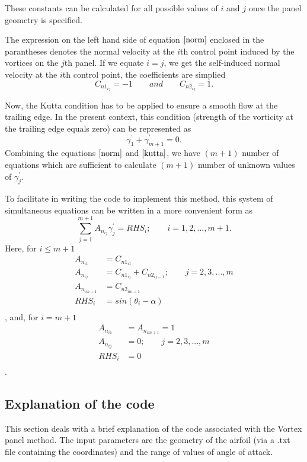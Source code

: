\documentclass[letterpaper,12pt]{article}
\begin{document}
These constants can be calculated for all possible values of $i$ and $j$ once the panel geometry is specified.

The expression on the left hand side of equation $\ref{norm}$ enclosed in the parantheses denotes the normal velocity at the $i$th control point induced by the vortices on the $j$th panel. If we equate $i=j$, we get the self-induced normal velocity at the $i$th control point, the coefficients are simplied
\[
C_{n1_{ij}} = -1\qquad and\qquad C_{n2_{ij}} = 1.
\]

Now, the Kutta condition has to be applied to ensure a smooth flow at the trailing edge. In the present context, this condition (strength of the vorticity at the trailing edge equals zero) can be represented as
\begin{equation}
\gamma_1^{'} + \gamma_{m+1}^{'} = 0.
\label{kutta}
\end{equation}
Combining the equations $\ref{norm}$ and $\ref{kutta}$, we have $(m+1)$ number of equations which are sufficient to calculate $(m+1)$ number of unknown values of $\gamma_j^{'}$.

To facilitate in writing the code to implement this method, this system of simultaneous equations can be written in a more convenient form as
\begin{equation}
\sum_{j=1}^{m+1}A_{n_{ij}}\gamma_j^{'} = RHS_i;\qquad i = 1,2,..., m+1.
\end{equation}
Here, for $i\leq m+1$
\begin{align*}
A_{n_{i1}} &= C_{{n1}_{i1}}\\
A_{n_{ij}} &= C_{{n1}_{ij}} + C_{{n2}_{ij-1}};\qquad j = 2,3,...,m\\
A_{n_{im+1}} &= C_{{n2}_{im+1}}\\
RHS_i &= sin(\theta_i - \alpha)\\
\end{align*},
and, for $i=m+1$
\begin{align*}
A_{n_{i1}} &= A_{n_{im+1}} = 1\\
A_{n_{ij}} &= 0;\qquad j = 2,3,...,m\\
RHS_i &= 0\\
\end{align*}.



\subsection{Explanation of the code}
\lstset{inputpath=./vortex_panel/}
This section deals with a brief explanation of the code associated with the Vortex panel method. The input parameters are the geometry of the airfoil (via a .txt file containing the coordinates) and the range of values of angle of attack.
\end{document}
